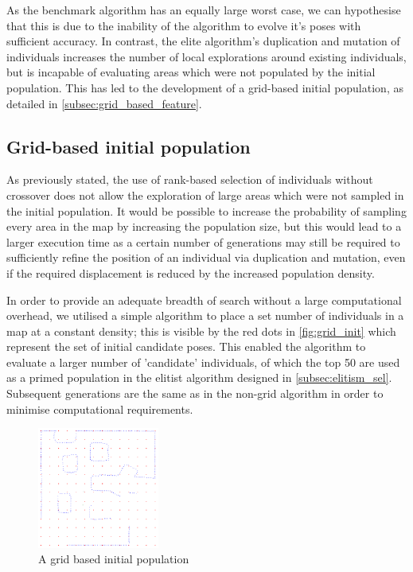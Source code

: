 \documentclass[authoryearcitations]{UoYCSproject}
\begin{document}
As the benchmark algorithm has an equally large worst case, we can hypothesise that this is due to the inability of the algorithm to evolve it's poses with sufficient accuracy. In contrast, the elite algorithm's duplication and mutation of individuals increases the number of local explorations around existing individuals, but is incapable of evaluating areas which were not populated by the initial population. This has led to the development of a grid-based initial population, as detailed in \autoref{subsec:grid_based_feature}.

\subsection{Grid-based initial population}
\label{subsec:grid_based_feature}
 As previously stated, the use of rank-based selection of individuals without crossover does not allow the exploration of large areas which were not sampled in the initial population. It would be possible to increase the probability of sampling every area in the map by increasing the population size, but this would lead to a larger execution time as a certain number of generations may still be required to sufficiently refine the position of an individual via duplication and mutation, even if the required displacement is reduced by the increased population density. \newline

 In order to provide an adequate breadth of search without a large computational overhead, we utilised a simple algorithm to place a set number of individuals in a map at a constant density; this is visible by the red dots in \autoref{fig:grid_init} which represent the set of initial candidate poses. This enabled the algorithm to evaluate a larger number of 'candidate' individuals, of which the top 50 are used as a primed population in the elitist algorithm designed in \autoref{subsec:elitism_sel}. Subsequent generations are the same as in the non-grid algorithm in order to minimise computational requirements. \newline

\begin{figure}[H]
\centering
	\includegraphics[width=4cm,keepaspectratio]{images/grid.png}
	\caption{A grid based initial population}
	\label{fig:grid_init}
\end{figure}
\end{document}
